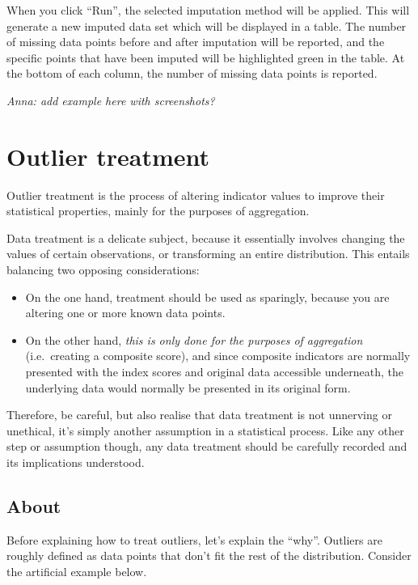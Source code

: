 \documentclass[
  letterpaper,
  DIV=11,
  numbers=noendperiod]{scrreprt}
\providecommand{\tightlist}{%
  \setlength{\itemsep}{0pt}\setlength{\parskip}{0pt}}\usepackage{longtable,booktabs,array}
\begin{document}
When you click ``Run'', the selected imputation method will be applied.
This will generate a new imputed data set which will be displayed in a
table. The number of missing data points before and after imputation
will be reported, and the specific points that have been imputed will be
highlighted green in the table. At the bottom of each column, the number
of missing data points is reported.

\emph{Anna: add example here with screenshots?}

\hypertarget{sec-outliers}{%
\chapter{Outlier treatment}\label{sec-outliers}}

Outlier treatment is the process of altering indicator values to improve
their statistical properties, mainly for the purposes of aggregation.

Data treatment is a delicate subject, because it essentially involves
changing the values of certain observations, or transforming an entire
distribution. This entails balancing two opposing considerations:

\begin{itemize}
\tightlist
\item
  On the one hand, treatment should be used as sparingly, because you
  are altering one or more known data points.
\item
  On the other hand, \emph{this is only done for the purposes of
  aggregation} (i.e.~creating a composite score), and since composite
  indicators are normally presented with the index scores and original
  data accessible underneath, the underlying data would normally be
  presented in its original form.
\end{itemize}

Therefore, be careful, but also realise that data treatment is not
unnerving or unethical, it's simply another assumption in a statistical
process. Like any other step or assumption though, any data treatment
should be carefully recorded and its implications understood.

\hypertarget{about-2}{%
\section{About}\label{about-2}}

Before explaining how to treat outliers, let's explain the ``why''.
Outliers are roughly defined as data points that don't fit the rest of
the distribution. Consider the artificial example below.
\end{document}
